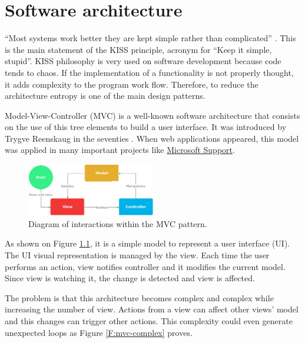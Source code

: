 \chapter{Software architecture}


“Most systems work better they are kept simple rather than complicated”
\cite{kiss-wiki}. This is the main statement of the KISS principle, acronym for
“Keep it simple, stupid”. KISS philosophy is very used on software development
because code tends to chaos. If the implementation of a functionality is not
properly thought, it adds complexity to the program work flow. Therefore, to
reduce the architecture entropy is one of the main design patterns.

Model-View-Controller (MVC) is a well-known software architecture that consists
on the use of this tree elements to build a user interface. It was introduced 
by Trygve Reenskaug in the seventies \cite{mvc-past-present}. When web
applications appeared, this model was applied in many important projects
like \href{https://support.microsoft.com}{Microsoft Support}. 


\begin{figure}[htb]
	\begin{center}
		\includegraphics[width=0.5\textwidth]{./figures/mvc.png}
		\caption{Diagram of interactions within the MVC pattern.
				 \cite{mvc-wiki}}
		\label{F:mvc}
	\end{center}
\end{figure}

As shown on Figure \ref{F:mvc}, it is a simple model to represent
a user interface (UI). The UI visual representation is managed by the view.
Each time the user performs an action, view notifies controller and it modifies
the current model. Since view is watching it, the change is detected and view
is affected.

The problem is that this architecture becomes complex and complex while 
increasing the number of view. Actions from a view can affect other views'
model and this changes can trigger other actions. This complexity could even
generate unexpected loops as Figure \ref{F:mvc-complex} proves.


